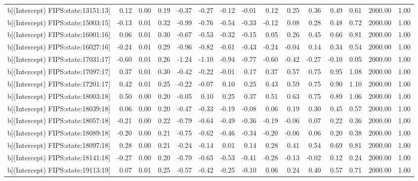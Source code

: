 \begin{table}[ht]
\begin{tabular}{rrrrrrrrrrrrrrr}
  b[(Intercept) FIPS:state:13151:13] & 0.12 & 0.00 & 0.19 & -0.37 & -0.27 & -0.12 & -0.01 & 0.12 & 0.25 & 0.36 & 0.49 & 0.61 & 2000.00 & 1.00 \\ 
  b[(Intercept) FIPS:state:15003:15] & -0.13 & 0.01 & 0.32 & -0.99 & -0.76 & -0.54 & -0.33 & -0.12 & 0.08 & 0.28 & 0.48 & 0.72 & 2000.00 & 1.00 \\ 
  b[(Intercept) FIPS:state:16001:16] & 0.06 & 0.01 & 0.30 & -0.67 & -0.53 & -0.32 & -0.15 & 0.05 & 0.26 & 0.45 & 0.66 & 0.81 & 2000.00 & 1.00 \\ 
  b[(Intercept) FIPS:state:16027:16] & -0.24 & 0.01 & 0.29 & -0.96 & -0.82 & -0.61 & -0.43 & -0.24 & -0.04 & 0.14 & 0.34 & 0.54 & 2000.00 & 1.00 \\ 
  b[(Intercept) FIPS:state:17031:17] & -0.60 & 0.01 & 0.26 & -1.24 & -1.10 & -0.94 & -0.77 & -0.60 & -0.42 & -0.27 & -0.10 & 0.05 & 2000.00 & 1.00 \\ 
  b[(Intercept) FIPS:state:17097:17] & 0.37 & 0.01 & 0.30 & -0.42 & -0.22 & -0.01 & 0.17 & 0.37 & 0.57 & 0.75 & 0.95 & 1.08 & 2000.00 & 1.00 \\ 
  b[(Intercept) FIPS:state:17201:17] & 0.42 & 0.01 & 0.25 & -0.22 & -0.07 & 0.10 & 0.25 & 0.43 & 0.59 & 0.75 & 0.90 & 1.10 & 2000.00 & 1.00 \\ 
  b[(Intercept) FIPS:state:18003:18] & 0.50 & 0.00 & 0.20 & -0.05 & 0.10 & 0.25 & 0.37 & 0.51 & 0.63 & 0.75 & 0.89 & 1.06 & 2000.00 & 1.00 \\ 
  b[(Intercept) FIPS:state:18039:18] & 0.06 & 0.00 & 0.20 & -0.47 & -0.33 & -0.19 & -0.08 & 0.06 & 0.19 & 0.30 & 0.45 & 0.57 & 2000.00 & 1.00 \\ 
  b[(Intercept) FIPS:state:18057:18] & -0.21 & 0.00 & 0.22 & -0.79 & -0.64 & -0.49 & -0.36 & -0.19 & -0.06 & 0.07 & 0.22 & 0.36 & 2000.00 & 1.00 \\ 
  b[(Intercept) FIPS:state:18089:18] & -0.20 & 0.00 & 0.21 & -0.75 & -0.62 & -0.46 & -0.34 & -0.20 & -0.06 & 0.06 & 0.20 & 0.38 & 2000.00 & 1.00 \\ 
  b[(Intercept) FIPS:state:18097:18] & 0.28 & 0.00 & 0.21 & -0.24 & -0.14 & 0.01 & 0.14 & 0.28 & 0.41 & 0.54 & 0.69 & 0.81 & 2000.00 & 1.00 \\ 
  b[(Intercept) FIPS:state:18141:18] & -0.27 & 0.00 & 0.20 & -0.79 & -0.65 & -0.53 & -0.41 & -0.28 & -0.13 & -0.02 & 0.12 & 0.24 & 2000.00 & 1.00 \\ 
  b[(Intercept) FIPS:state:19113:19] & 0.07 & 0.01 & 0.25 & -0.57 & -0.42 & -0.25 & -0.10 & 0.06 & 0.24 & 0.40 & 0.57 & 0.71 & 2000.00 & 1.00 \\ 

\end{tabular}
\end{table}

